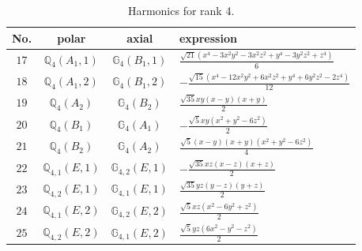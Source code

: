 \documentclass[fleqn,8pt,landscape]{jsarticle}
\begin{document}
\begin{table}[ht!]
\begin{center}
\caption{Harmonics for rank 4.}
\renewcommand{\arraystretch}{1.3}
\begin{tabular}{cccl} \hline \hline
No. & polar & axial & expression \\ \hline
$ 17 $ & $ \mathbb{Q}_{4}(A_{1},1) $ & $ \mathbb{G}_{4}(B_{1},1) $ & $ \frac{\sqrt{21} \left(x^{4} - 3 x^{2} y^{2} - 3 x^{2} z^{2} + y^{4} - 3 y^{2} z^{2} + z^{4}\right)}{6} $ \\
$ 18 $ & $ \mathbb{Q}_{4}(A_{1},2) $ & $ \mathbb{G}_{4}(B_{1},2) $ & $ - \frac{\sqrt{15} \left(x^{4} - 12 x^{2} y^{2} + 6 x^{2} z^{2} + y^{4} + 6 y^{2} z^{2} - 2 z^{4}\right)}{12} $ \\
$ 19 $ & $ \mathbb{Q}_{4}(A_{2}) $ & $ \mathbb{G}_{4}(B_{2}) $ & $ \frac{\sqrt{35} x y \left(x - y\right) \left(x + y\right)}{2} $ \\
$ 20 $ & $ \mathbb{Q}_{4}(B_{1}) $ & $ \mathbb{G}_{4}(A_{1}) $ & $ - \frac{\sqrt{5} x y \left(x^{2} + y^{2} - 6 z^{2}\right)}{2} $ \\
$ 21 $ & $ \mathbb{Q}_{4}(B_{2}) $ & $ \mathbb{G}_{4}(A_{2}) $ & $ \frac{\sqrt{5} \left(x - y\right) \left(x + y\right) \left(x^{2} + y^{2} - 6 z^{2}\right)}{4} $ \\
$ 22 $ & $ \mathbb{Q}_{4,1}(E,1) $ & $ \mathbb{G}_{4,2}(E,1) $ & $ - \frac{\sqrt{35} x z \left(x - z\right) \left(x + z\right)}{2} $ \\
$ 23 $ & $ \mathbb{Q}_{4,2}(E,1) $ & $ \mathbb{G}_{4,1}(E,1) $ & $ \frac{\sqrt{35} y z \left(y - z\right) \left(y + z\right)}{2} $ \\
$ 24 $ & $ \mathbb{Q}_{4,1}(E,2) $ & $ \mathbb{G}_{4,2}(E,2) $ & $ \frac{\sqrt{5} x z \left(x^{2} - 6 y^{2} + z^{2}\right)}{2} $ \\
$ 25 $ & $ \mathbb{Q}_{4,2}(E,2) $ & $ \mathbb{G}_{4,1}(E,2) $ & $ \frac{\sqrt{5} y z \left(6 x^{2} - y^{2} - z^{2}\right)}{2} $ \\
 \hline \hline
\end{tabular}
\end{center}
\end{table}
\end{document}

